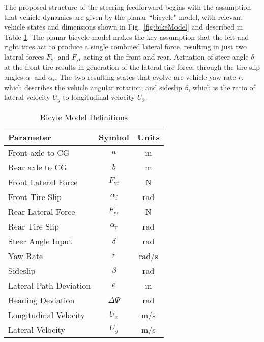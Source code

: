 The proposed structure of the steering feedforward begins with the assumption that vehicle dynamics are given by the planar ``bicycle" model,
 with relevant vehicle states and dimensions shown in Fig.~\ref{fig:bikeModel} and described in Table \ref{tb:bikeModelDefns}. The planar bicycle model makes the
key assumption that the left and right tires act to produce a single combined lateral force, resulting
in just two lateral forces $F_\mathrm{yf}$ and $F_\mathrm{yr}$ acting at the front  and rear. Actuation of steer angle $\delta$
at the front tire results in generation of the lateral tire forces through the tire slip angles $\alpha_\mathrm{f}$ and $\alpha_\mathrm{r}$. 
The two resulting states that evolve are vehicle yaw rate $r$, which describes the vehicle angular rotation,
 and sideslip $\beta$, which is the ratio of lateral velocity $U_y$ to longitudinal velocity $U_x$.  
 
  \begin{table}[h]
\begin{center}
\caption{Bicyle Model Definitions}\label{tb:bikeModelDefns}
\begin{tabular}{lcc}
Parameter & Symbol & Units \\\hline
Front axle to CG & $a$ & m\\
Rear axle to CG & $b$  & m\\
Front Lateral Force & $F_\mathrm{yf}$ & N\\
Front Tire Slip     & $\alpha_\mathrm{f}$ & rad \\
Rear Lateral Force & $F_\mathrm{yr}$ & N\\
Rear Tire Slip     & $\alpha_\mathrm{r}$ & rad \\
Steer Angle Input  & $\delta$           & rad \\
Yaw Rate   & $r$ & rad/s \\
Sideslip   & $\beta$ & rad \\
Lateral Path Deviation & $e$ & m \\
Heading Deviation & $\Delta\Psi$ & rad \\
Longitudinal Velocity & $U_x$ & m/s \\
Lateral Velocity & $U_y$ & m/s \\\hline
\end{tabular}
\end{center}
\end{table}
 
